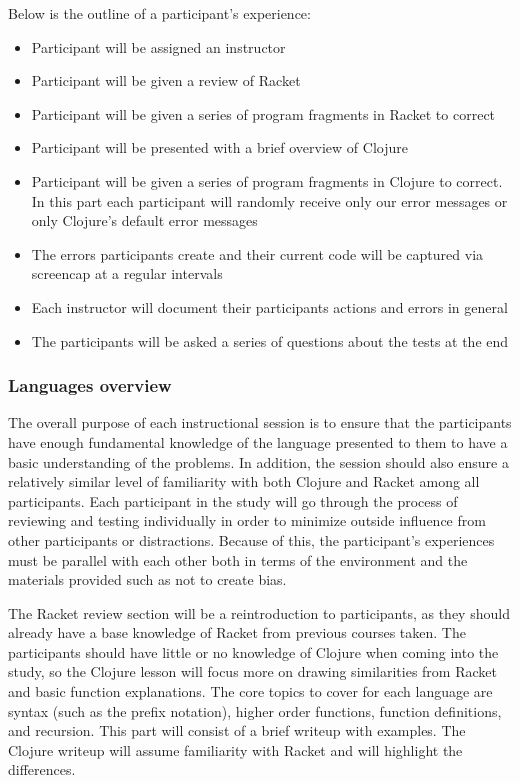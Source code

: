 \documentclass[submission,copyright,creativecommons]{eptcs}
\begin{document}
Below is the outline of a participant's experience:
\begin{itemize}
\item Participant will be assigned an instructor
\item Participant will be given a review of Racket
\item Participant will be given a series of program fragments in Racket to correct
\item Participant will be presented with a brief overview of Clojure
\item Participant will be given a series of  program fragments in Clojure to correct. In this part each participant will randomly receive only our error messages or only Clojure's default error messages
\item The errors participants create and their current code will be captured via screencap at a regular intervals
\item Each instructor will document their participants actions and errors in general
\item The participants will be asked a series of questions about the tests at the end
\end{itemize}

\subsubsection{Languages overview}\label{subsec:overview}

The overall purpose of each instructional session is to ensure that the participants have enough fundamental knowledge of the language presented to them to have a basic understanding of the problems. 
In addition, the session should also ensure a relatively similar level of familiarity with both Clojure and Racket among all participants. 
Each participant in the study will go through the process of reviewing and testing individually in order to minimize outside influence from other participants or distractions. 
Because of this, the participant's experiences must be parallel with each other both in terms of the environment and the materials provided such as not to create bias.

The Racket review section will be a reintroduction to participants, as they should already have a base knowledge of Racket from previous courses taken.
The participants should have little or no knowledge of Clojure when coming into the study, so the Clojure lesson will focus more on drawing similarities from Racket and basic function explanations.
The core topics to cover for each language are syntax (such as the prefix notation), higher order functions, function definitions, and recursion.
This part will consist of a brief writeup with examples. The Clojure writeup will assume familiarity with Racket and will highlight the differences. 
\end{document}
